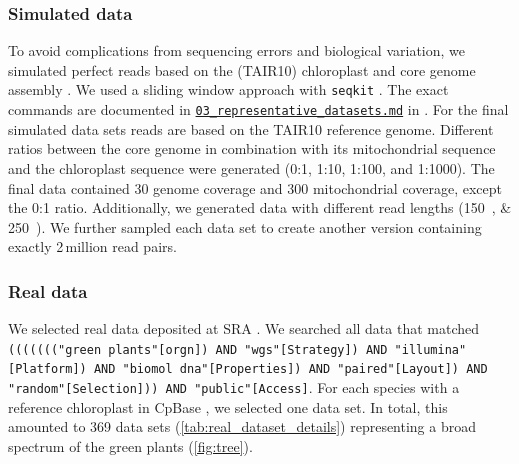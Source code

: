 \documentclass{bmcart}
\newcommand{\todo}[1]{\textcolor{red}{\bfseries(ToDO: #1})}
\newcommand{\zenododataset}{\cite{zenododataset}}
\begin{document}
\subsubsection*{Simulated data}
To avoid complications from sequencing errors and biological variation, we simulated perfect reads based on the  (TAIR10) chloroplast and core genome assembly \cite{tair10}.
We used a sliding window approach with \texttt{seqkit} \cite{seqkit}. The exact commands are documented in \href{https://github.com/chloroExtractorTeam/benchmark/blob/master/03_representative_datasets.md}{\texttt{03\_representative\_datasets.md}} in \zenododataset{}.
For the final simulated data sets reads are based on the TAIR10 reference genome.
Different ratios between the  core genome in combination with its mitochondrial sequence and the chloroplast sequence were generated (\num{0}:\num{1}, \num{1}:\num{10}, \num{1}:\num{100}, and \num{1}:\num{1000}).
The final data contained \SI{30}{\times} genome coverage and \SI{300}{\times} mitochondrial coverage, except the \num{0}:\num{1} ratio.
Additionally, we generated data with different read lengths (\SIlist{150;250}{\basepair}). We further sampled each data set to create another version containing exactly 2\,million read pairs.


\subsubsection*{Real data}
We selected real data deposited at SRA \cite{sra2010}.
We searched all data that matched \texttt{((((((("green plants"[orgn]) AND "wgs"[Strategy]) AND "illumina"[Platform]) AND "biomol dna"[Properties]) AND "paired"[Layout]) AND "random"[Selection])) AND "public"[Access]}\cite{sra_search_term}. 
For each species with a reference chloroplast in CpBase \cite{cpbase}, we selected one data set.
In total, this amounted to \num{369} data sets (\cref{tab:real_dataset_details}) representing a broad spectrum of the green plants (\cref{fig:tree}).
\end{document}
